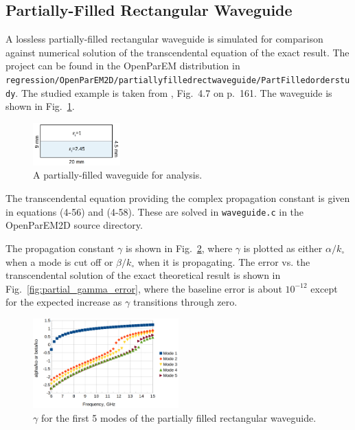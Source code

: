 \documentclass[titlepage]{article}
\renewcommand\_{\textunderscore\linebreak[1]}
\begin{document}
\subsection{Partially-Filled Rectangular Waveguide}

A lossless partially-filled rectangular waveguide is simulated for comparison against numerical solution of the transcendental equation of the exact result. The project can be found in the OpenParEM distribution in \texttt{regression/OpenParEM2D/partially\_filled\_rect\_waveguide/PartFilled\_order\_6\_study}.  The studied example is taken from \cite{Harrington}, Fig.~4.7 on p.~161.  The waveguide is shown in Fig.~\ref{fig:partial_drawing}.
\begin{figure}[H]
  \centering
  \includegraphics[width=0.3\textwidth]{../regression/OpenParEM2D/partially_filled_rect_waveguide/PartFilled_order_6_study/screenshots/partial_drawing}
  \caption{A partially-filled waveguide for analysis.}
  \label{fig:partial_drawing}
\end{figure}

The transcendental equation providing the complex propagation constant is given in \cite{Harrington} equations (4-56) and (4-58).  These are solved in \texttt{waveguide.c} in the OpenParEM2D source directory.

The propagation constant $\gamma$ is shown in Fig.~\ref{fig:partial_gamma}, where $\gamma$ is plotted as either $\alpha/k_{\circ}$ when a mode is cut off or $\beta/k_{\circ}$ when it is propagating.  The error vs. the transcendental solution of the exact theoretical result is shown in Fig.~\ref{fig:partial_gamma_error}, where the baseline error is about $10^{-12}$ except for the expected increase as $\gamma$ transitions through zero.

\begin{figure}[H]
  \centering
  \includegraphics[width=0.5\textwidth]{../regression/OpenParEM2D/partially_filled_rect_waveguide/PartFilled_order_6_study/screenshots/partial_gamma}
  \caption{$\gamma$ for the first 5 modes of the partially filled rectangular waveguide.}
  \label{fig:partial_gamma}
\end{figure}
\end{document}
